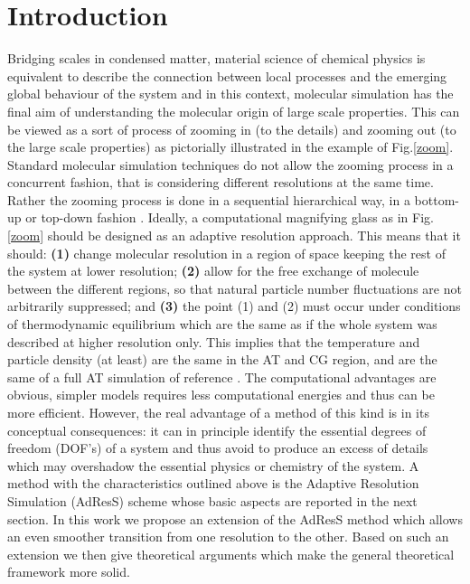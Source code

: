 \documentclass[aps,pre,preprint]{revtex4}
\begin{document}
\section{Introduction}
Bridging scales in condensed matter, material science of chemical physics is equivalent to describe the connection between local processes and the emerging global behaviour of the system and in this context, molecular simulation has the final aim of understanding the molecular origin of large scale properties. This can be viewed as a sort of process of zooming in (to the details) and zooming out (to the large scale properties) as pictorially illustrated in the example of Fig.\ref{zoom}. Standard molecular simulation techniques do not allow the zooming process in a concurrent fashion, that is considering different resolutions at the same time. Rather the zooming process is done in a sequential hierarchical way, in a bottom-up or top-down fashion \cite{annurev}. Ideally, a computational magnifying glass as in Fig.\ref{zoom} should be designed as an adaptive resolution approach. This means that it should: {\bf (1)} change molecular resolution in a region of space keeping the rest of the system at lower resolution; {\bf (2)} allow for the free exchange of molecule between the different regions, so that natural particle number fluctuations  are not arbitrarily suppressed; and {\bf (3)} the point (1) and (2) must occur under conditions of thermodynamic equilibrium which are the same as if the whole system was described at higher resolution only.
This implies that the temperature and particle density (at least) are the same in the AT and CG region, and are the same of a full AT simulation of reference \cite{annurev}. The computational advantages are obvious, simpler models requires less computational energies and thus can be more efficient. However, the real advantage of a method of this kind is in its conceptual consequences: it can in principle identify the essential degrees of freedom (DOF's) of a system and thus avoid to produce an excess of details which may overshadow the essential physics or chemistry of the system. A method with the characteristics outlined above is the Adaptive Resolution Simulation (AdResS) scheme \cite{jcp,pre} whose basic aspects are reported in the next section. In this work we propose an extension of the AdResS method which allows an even smoother transition from one resolution to the other. Based on such an extension we then give theoretical arguments which make the general theoretical framework more solid.
\end{document}
